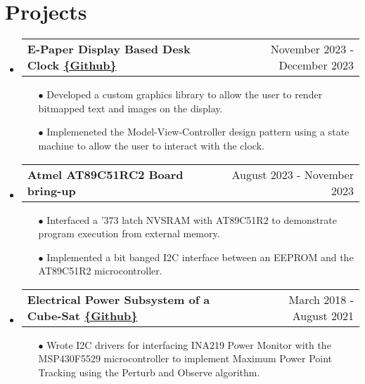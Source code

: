 \documentclass[a4,11pt]{article}
\makeatletter
\newcommand{\resumeSubheadingP}[2]{
  \vspace{-2pt}\item
    \begin{tabular*}{1.0\textwidth}[t]{l@{\extracolsep{\fill}}r}
       \textbf{{\large #1}} &  {#2} \\
    \end{tabular*}\vspace{-1pt}
}
\newcommand{\resumeSubHeadingListStart}{\begin{itemize}[leftmargin=0.0in, label={}]}
\newcommand{\resumeSubHeadingListEnd}{\end{itemize}}
\makeatother
\begin{document}
\section{Projects}
  \resumeSubHeadingListStart
    \resumeSubheadingP
    {E-Paper Display Based Desk Clock \href{https://github.com/parthkharade/Eink-DeskClock}{\{Github\}}}{November 2023 - December 2023}
    \begin{itemize}\setlength{\itemsep}{0pt}\setlength{\parskip}{0pt}\vspace{-0.2cm}
            \item[$\bullet$] Developed a custom graphics library to allow the user to render bitmapped text and images on the display.
            \item[$\bullet$] Implemeneted the Model-View-Controller design pattern using a state machine to allow the user to interact with the clock.
        \end{itemize}
    \resumeSubheadingP
    {Atmel AT89C51RC2 Board bring-up}{August 2023 - November 2023}
    \begin{itemize}\setlength{\itemsep}{0pt}\setlength{\parskip}{0pt}\vspace{-0.2cm}
            \item[$\bullet$] Interfaced a '373 latch NVSRAM with AT89C51R2 to demonstrate program execution from external memory.
            \item[$\bullet$] Implemented a bit banged I2C interface between an EEPROM and the AT89C51R2 microcontroller.
        \end{itemize}
    \resumeSubheadingP
    {Electrical Power Subsystem of a Cube-Sat \href{https://github.com/parthkharade/MSP430F5529}{\{Github\}}}{March 2018 - August 2021}
    \begin{itemize}\setlength{\itemsep}{0pt}\setlength{\parskip}{0pt}\vspace{-0.2cm}
            \item[$\bullet$] Wrote I2C drivers for interfacing INA219 Power Monitor with the MSP430F5529 microcontroller to implement Maximum Power Point Tracking using the Perturb and Observe algorithm.
        \end{itemize}
    \resumeSubHeadingListEnd
\vspace{-16pt}
\end{document}
